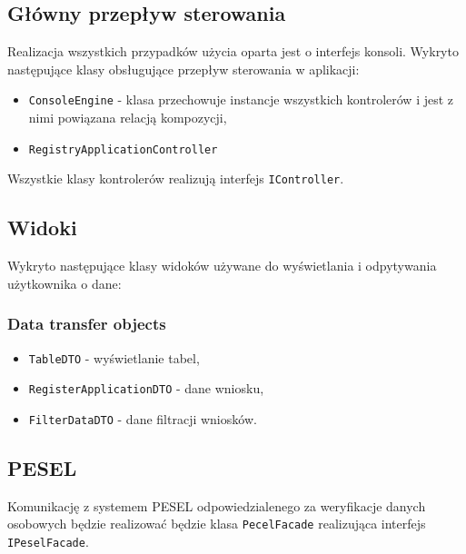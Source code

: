 \documentclass[12pt]{article}
\begin{document}
\subsection{Główny przepływ sterowania}
Realizacja wszystkich przypadków użycia oparta jest o interfejs konsoli. 
Wykryto następujące klasy obsługujące przepływ sterowania w aplikacji:
\begin{itemize}[noitemsep]
    \item \lstinline{ConsoleEngine} - klasa przechowuje instancje wszystkich kontrolerów i jest z nimi powiązana relacją kompozycji,
    \item \lstinline{RegistryApplicationController}
\end{itemize}
Wszystkie klasy kontrolerów realizują interfejs \lstinline{IController}.

\subsection{Widoki}
Wykryto następujące klasy widoków używane do wyświetlania i odpytywania użytkownika o dane:
\subsubsection{Data transfer objects}

\begin{itemize}[noitemsep]
    \item \lstinline{TableDTO} - wyświetlanie tabel,
    \item \lstinline{RegisterApplicationDTO} - dane wniosku,
    \item \lstinline{FilterDataDTO} - dane filtracji wniosków.
\end{itemize}

\subsection{PESEL}
Komunikację z systemem PESEL odpowiedzialenego za weryfikacje danych osobowych będzie realizować będzie klasa \lstinline{PecelFacade} realizująca interfejs \lstinline{IPeselFacade}.
\end{document}
